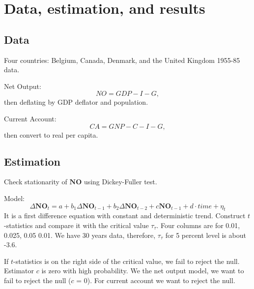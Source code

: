 \documentclass[12pt]{article}
\begin{document}
\section{Data, estimation, and results}

\subsection{Data}
Four countries: Belgium, Canada, Denmark, and the United Kingdom 1955-85 data.

Net Output:
\begin{equation*}
NO = GDP - I - G,
\end{equation*}
then deflating by GDP deflator and population.

Current Account:
\begin{equation*}
CA = GNP - C - I - G,
\end{equation*}
then convert to real per capita.


\subsection{Estimation}
Check stationarity of $ \bm{NO} $ using Dickey-Fuller test.

Model:
\begin{equation*}
\Delta \bm{NO}_{t} = a + b_1 \Delta \bm{NO}_{t - 1} + b_2 \Delta \bm{NO}_{t - 2} + c
\bm{NO}_{t - 1} + d \cdot time  + \eta_{t}
\end{equation*}
It is a first difference equation with constant and deterministic trend. Construct 
$ t $-statistics and compare it with the critical value $ \tau_{\tau} $. Four columns
are for 0.01, 0.025, 0.05 0.01. We have 30 years data, therefore, $ \tau_{\tau} $ for 
5 percent level is about -3.6.

\begin{figure}[H]
\end{figure}

If $ t $-statistics is on the right side of the critical value, we fail to reject the
null. Estimator $ c $ is zero with high probability.
We the net output model, we want to fail to reject the null ($ c $ = 0). For current
account we want to reject the null.
\end{document}
